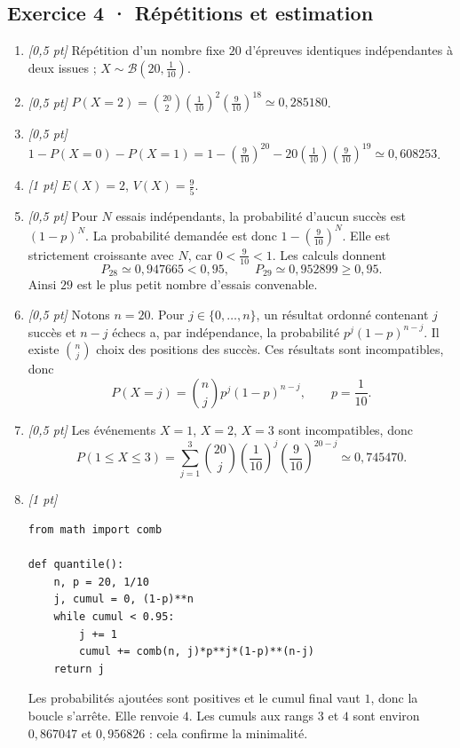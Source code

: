 \subsection*{Exercice 4 · Répétitions et estimation}\begin{enumerate}

\item \textit{[0{,}5 pt]} Répétition d'un nombre fixe $20$ d'épreuves identiques indépendantes à deux issues ; $X\sim\mathcal B(20,\frac{1}{10})$.

\item \textit{[0{,}5 pt]} $P(X=2)=\binom{20}2(\frac{1}{10})^2(\frac{9}{10})^{18}\simeq0{,}285180$.

\item \textit{[0{,}5 pt]} $1-P(X=0)-P(X=1)=1-(\frac{9}{10})^{20}-20(\frac{1}{10})(\frac{9}{10})^{19}\simeq0{,}608253$.

\item \textit{[1 pt]} $E(X)=2$, $V(X)=\frac{9}{5}$.

\item \textit{[0{,}5 pt]} Pour $N$ essais indépendants, la probabilité d'aucun succès est $(1-p)^N$. La probabilité demandée est donc $1-(\frac{9}{10})^N$. Elle est strictement croissante avec $N$, car $0<\frac{9}{10}<1$. Les calculs donnent
\[P_{28}\simeq0{,}947665<0{,}95,\qquad P_{29}\simeq0{,}952899\ge0{,}95.\]
Ainsi $29$ est le plus petit nombre d'essais convenable.

\item \textit{[0{,}5 pt]} Notons $n=20$. Pour $j\in\{0,\ldots,n\}$, un résultat ordonné contenant $j$ succès et $n-j$ échecs a, par indépendance, la probabilité $p^j(1-p)^{n-j}$. Il existe $\binom nj$ choix des positions des succès. Ces résultats sont incompatibles, donc
\[P(X=j)=\binom nj p^j(1-p)^{n-j},\qquad p=\frac{1}{10}.\]

\item \textit{[0{,}5 pt]} Les événements $X=1$, $X=2$, $X=3$ sont incompatibles, donc
\[P(1\le X\le3)=\sum_{j=1}^3\binom{20}j(\frac{1}{10})^j(\frac{9}{10})^{20-j}\simeq0{,}745470.\]


\item \textit{[1 pt]} 
\begin{lstlisting}
from math import comb

def quantile():
    n, p = 20, 1/10
    j, cumul = 0, (1-p)**n
    while cumul < 0.95:
        j += 1
        cumul += comb(n, j)*p**j*(1-p)**(n-j)
    return j
\end{lstlisting}
Les probabilités ajoutées sont positives et le cumul final vaut $1$, donc la boucle s'arrête. Elle renvoie $4$. Les cumuls aux rangs $3$ et $4$ sont environ $0{,}867047$ et $0{,}956826$ : cela confirme la minimalité.

\end{enumerate}

\fi

\fi

